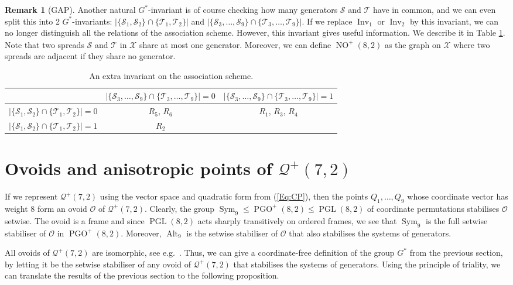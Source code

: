 \documentclass[a4paper]{article}
\theoremstyle{definition}
\newtheorem{rmk}[thm]{Remark}
\renewcommand{\leq}{\leqslant}
\newcommand{\mo}{\mathcal O}
\newcommand{\mq}{\mathcal Q}
\newcommand{\ms}{\mathcal S}
\newcommand{\mt}{\mathcal T}
\newcommand{\mx}{\mathcal X}
\DeclareMathOperator{\PGL}{PGL}
\DeclareMathOperator{\PGO}{PGO}
\DeclareMathOperator{\NO}{NO}
\newcommand{\nono}{\overline{\NO^+}(8,2)}
\DeclareMathOperator{\Sym}{Sym}
\DeclareMathOperator{\Alt}{Alt}
\DeclareMathOperator{\Inv}{Inv}
\begin{document}
\begin{rmk}[GAP]
 \label{Rmk:extra invariant}
Another natural $G^*$-invariant is of course checking how many generators $\ms$ and $\mt$ have in common, and we can even split this into 2 $G^*$-invariants: $|\{\ms_1, \ms_2\} \cap \{\mt_1, \mt_2\}|$ and $|\{\ms_3, \dots, \ms_9\} \cap \{\mt_3, \dots, \mt_9\}|$.
If we replace $\Inv_1$ or $\Inv_2$ by this invariant, we can no longer distinguish all the relations of the association scheme.
However, this invariant gives useful information.
We describe it in Table \ref{tab:extra invariant}.
 Note that two spreads $\ms$ and $\mt$ in $\mx$ share at most one generator.
 Moreover, we can define $\nono$ as the graph on $\mx$ where two spreads are adjacent if they share no generator.

\begin{table}[h!]
 \centering
 \begin{tabular}{|c||c|c|}
 \hline
 & $|\{\ms_3, \dots, \ms_9\} \cap \{\mt_3, \dots, \mt_9\}| = 0$ & $|\{\ms_3, \dots, \ms_9\} \cap \{\mt_3, \dots, \mt_9\}| = 1$ \\ \hline \hline
 $|\{\ms_1, \ms_2\} \cap \{\mt_1, \mt_2\}| = 0$ & $R_5$, $R_6$ & $R_1$, $R_3$, $R_4$ \\ \hline
 $|\{\ms_1, \ms_2\} \cap \{\mt_1, \mt_2\}| = 1$ & $R_2$ & \\ \hline
 \end{tabular}
 \caption{An extra invariant on the association scheme.}
 \label{tab:extra invariant}
\end{table}
\end{rmk}

\section{Ovoids and anisotropic points \texorpdfstring{of $\mq^+(7,2)$}{}}

If we represent $\mq^+(7,2)$ using the vector space and quadratic form from (\ref{Eq:CP}), then the points $Q_1, \dots, Q_9$ whose coordinate vector has weight 8 form an ovoid $\mo$ of $\mq^+(7,2)$.
Clearly, the group $\Sym_9 \leq \PGO^+(8,2) \leq \PGL(8,2)$ of coordinate permutations stabilises $\mo$ setwise.
The ovoid is a frame and since $\PGL(8,2)$ acts sharply transitively on ordered frames, we see that $\Sym_9$ is the full setwise stabiliser of $\mo$ in $\PGO^+(8,2)$.
Moreover, $\Alt_9$ is the setwise stabiliser of $\mo$ that also stabilises the systems of generators.

All ovoids of $\mq^+(7,2)$ are isomorphic, see e.g.\ \cite{Cameron:Praeger}.
Thus, we can give a coordinate-free definition of the group $G^*$ from the previous section, by letting it be the setwise stabiliser of any ovoid of $\mq^+(7,2)$ that stabilises the systems of generators.
Using the principle of triality, we can translate the results of the previous section to the following proposition.
\end{document}
